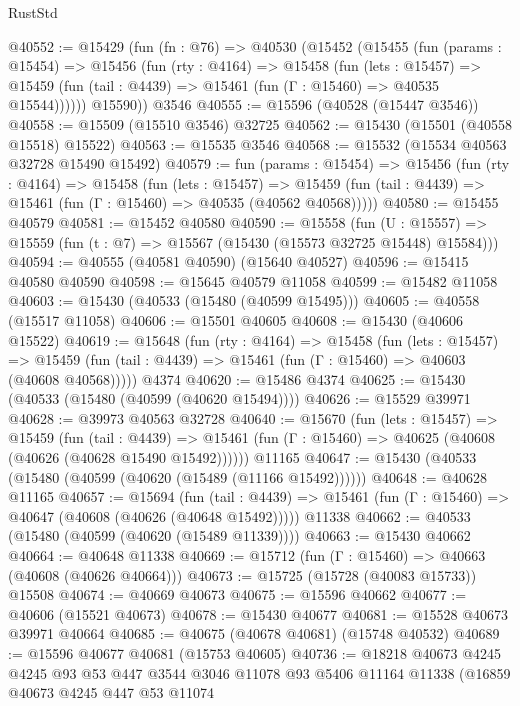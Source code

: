 \begin{lexlean}{RustStd}
\begin{coremodule}
@40552 := @15429
    (fun (fn : @76) =>
    @40530
      (@15452
        (@15455
          (fun (params : @15454) =>
          @15456
            (fun (rty : @4164) =>
            @15458
              (fun (lets : @15457) =>
              @15459 (fun (tail : @4439) => @15461 (fun (Γ : @15460) => @40535 @15544))))))
        @15590))
    @3546
@40555 := @15596 (@40528 (@15447 @3546))
@40558 := @15509 (@15510 @3546) @32725
@40562 := @15430 (@15501 (@40558 @15518) @15522)
@40563 := @15535 @3546
@40568 := @15532 (@15534 @40563 @32728 @15490 @15492)
@40579 := fun (params : @15454) =>
  @15456
    (fun (rty : @4164) =>
    @15458
      (fun (lets : @15457) =>
      @15459 (fun (tail : @4439) => @15461 (fun (Γ : @15460) => @40535 (@40562 @40568)))))
@40580 := @15455 @40579
@40581 := @15452 @40580
@40590 := @15558
    (fun (U : @15557) => @15559 (fun (t : @7) => @15567 (@15430 (@15573 @32725 @15448) @15584)))
@40594 := @40555 (@40581 @40590) (@15640 @40527)
@40596 := @15415 @40580 @40590
@40598 := @15645 @40579 @11058
@40599 := @15482 @11058
@40603 := @15430 (@40533 (@15480 (@40599 @15495)))
@40605 := @40558 (@15517 @11058)
@40606 := @15501 @40605
@40608 := @15430 (@40606 @15522)
@40619 := @15648
    (fun (rty : @4164) =>
    @15458
      (fun (lets : @15457) =>
      @15459 (fun (tail : @4439) => @15461 (fun (Γ : @15460) => @40603 (@40608 @40568)))))
    @4374
@40620 := @15486 @4374
@40625 := @15430 (@40533 (@15480 (@40599 (@40620 @15494))))
@40626 := @15529 @39971
@40628 := @39973 @40563 @32728
@40640 := @15670
    (fun (lets : @15457) =>
    @15459
      (fun (tail : @4439) =>
      @15461 (fun (Γ : @15460) => @40625 (@40608 (@40626 (@40628 @15490 @15492))))))
    @11165
@40647 := @15430 (@40533 (@15480 (@40599 (@40620 (@15489 (@11166 @15492))))))
@40648 := @40628 @11165
@40657 := @15694
    (fun (tail : @4439) => @15461 (fun (Γ : @15460) => @40647 (@40608 (@40626 (@40648 @15492)))))
    @11338
@40662 := @40533 (@15480 (@40599 (@40620 (@15489 @11339))))
@40663 := @15430 @40662
@40664 := @40648 @11338
@40669 := @15712 (fun (Γ : @15460) => @40663 (@40608 (@40626 @40664)))
@40673 := @15725 (@15728 (@40083 @15733)) @15508
@40674 := @40669 @40673
@40675 := @15596 @40662
@40677 := @40606 (@15521 @40673)
@40678 := @15430 @40677
@40681 := @15528 @40673 @39971 @40664
@40685 := @40675 (@40678 @40681) (@15748 @40532)
@40689 := @15596 @40677 @40681 (@15753 @40605)
@40736 := @18218
    @40673
    @4245
    @4245
    @93
    @53
    @447
    @3544
    @3046
    @11078
    @93
    @5406
    @11164
    @11338
    (@16859
      @40673
      @4245
      @447
      @53
      @11074

\end{coremodule}
\end{lexlean}
